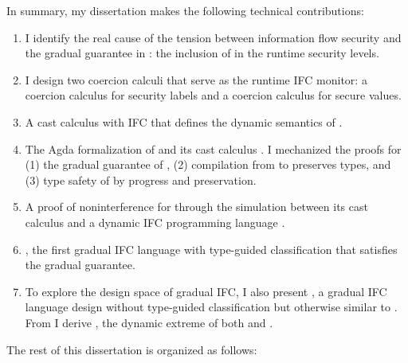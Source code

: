 In summary, my dissertation makes the following technical contributions:

\begin{enumerate}
\item I identify the real cause of the tension between information flow security
  and the gradual guarantee in \GSLRef: the inclusion of \unk in the runtime
  security levels.
\item I design two coercion calculi that serve as the runtime IFC monitor: a
  coercion calculus for security labels and a coercion calculus for secure
  values.
\item A cast calculus \CC with IFC that defines the dynamic semantics of
  \Surface.
\item The Agda formalization of \Surface and its cast calculus \CC. I mechanized
  the proofs for (1) the gradual guarantee of \Surface, (2)
  compilation from \Surface to \CC preserves types, and (3) type safety
  of \CC by progress and preservation.
\item A proof of noninterference for \Surface through the simulation between its
  cast calculus \CC and a dynamic IFC programming language \DynIFC.
\item \Surface, the first gradual IFC language with type-guided
  classification that satisfies the gradual guarantee.
\item To explore the design space of gradual IFC, I also present \SurfaceOld, a
  gradual IFC language design without type-guided classification but otherwise
  similar to \Surface. From \SurfaceOld I derive \DynIFC, the dynamic extreme of
  both \SurfaceOld and \Surface.
\end{enumerate}

The rest of this dissertation is organized as follows:

